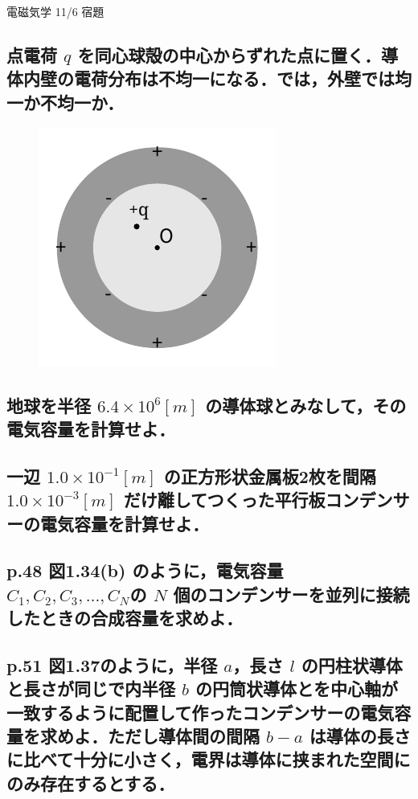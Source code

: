 \documentclass[a4paper, 12pt]{bxjsarticle}
\begin{document}
\begin{center}
    \begin{LARGE}
        {\huge 電磁気学 11/6 宿題} 
    \end{LARGE}
\end{center}

\vspace{-1em}
\subsection{点電荷 \(q\) を同心球殻の中心からずれた点に置く．導体内壁の電荷分布は不均一になる．では，外壁では均一か不均一か．}
\vspace{-1.5em}
\begin{figure}[h]
	\includegraphics[scale=0.8]{drawing.pdf}
\end{figure}

\vspace{7.2em}

\subsection{地球を半径 \(6.4\times10^{6}\si{[m]}\) の導体球とみなして，その電気容量を計算せよ．}

\vspace{20em}
\newpage

\subsection{一辺 \(1.0\times10^{-1}\si{[m]}\) の正方形状金属板2枚を間隔 \(1.0\times10^{-3}\si{[m]}\) だけ離してつくった平行板コンデンサーの電気容量を計算せよ．}
\vspace{23em}

\subsection{p.48 図1.34(b) のように，電気容量 \(C_1,C_2,C_3,\ldots,C_N\)の \(N\) 個のコンデンサーを並列に接続したときの合成容量を求めよ．}

\newpage
\subsection{p.51 図1.37のように，半径 \(a\)，長さ \(l\) の円柱状導体と長さが同じで内半径 \(b\) の円筒状導体とを中心軸が一致するように配置して作ったコンデンサーの電気容量を求めよ．ただし導体間の間隔 \(b-a\) は導体の長さに比べて十分に小さく，電界は導体に挟まれた空間にのみ存在するとする．}
\end{document}
